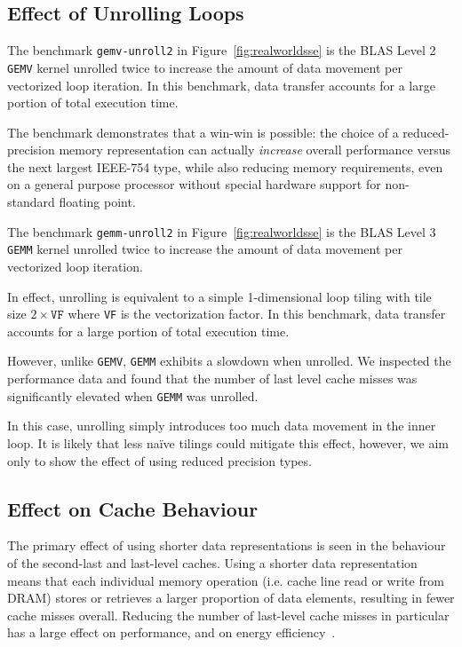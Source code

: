 \documentclass{sig-alternate-05-2015}
\newcommand{\mt}[1]{\texttt{#1}}
\begin{document}
\subsection{Effect of Unrolling Loops}

The benchmark \texttt{gemv-unroll2} in Figure~\ref{fig:realworldsse} is the
BLAS Level 2 \texttt{GEMV} kernel unrolled twice to increase the amount of data
movement per vectorized loop iteration. In this benchmark, data transfer
accounts for a large portion of total execution time.

The benchmark demonstrates that a win-win is possible: the choice of a
reduced-precision memory representation can actually \emph{increase} overall
performance versus the next largest IEEE-754 type, while also reducing memory
requirements, even on a general purpose processor without special hardware
support for non-standard floating point.

The benchmark \texttt{gemm-unroll2} in Figure~\ref{fig:realworldsse} is the
BLAS Level 3 \texttt{GEMM} kernel unrolled twice to increase the amount of data
movement per vectorized loop iteration.

In effect, unrolling is equivalent to a simple 1-dimensional loop tiling with
tile size $2\times\mathtt{VF}$ where \mt{VF} is the vectorization factor. In
this benchmark, data transfer accounts for a large portion of total execution
time.

However, unlike \texttt{GEMV}, \texttt{GEMM} exhibits a slowdown when unrolled.
We inspected the performance data and found that the number of last level cache
misses was significantly elevated when \texttt{GEMM} was unrolled.

In this case, unrolling simply introduces too much data movement in the inner
loop. It is likely that less na\"ive tilings could mitigate this effect,
however, we aim only to show the effect of using reduced precision types.

\eject
\subsection{Effect on Cache Behaviour}

The primary effect of using shorter data representations is seen in the
behaviour of the second-last and last-level caches. Using a shorter data
representation means that each individual memory operation (i.e. cache line
read or write from DRAM) stores or retrieves a larger proportion of data
elements, resulting in fewer cache misses overall. Reducing the number of
last-level cache misses in particular has a large effect on performance, and on
energy efficiency~\cite{gustafson}.
\end{document}
